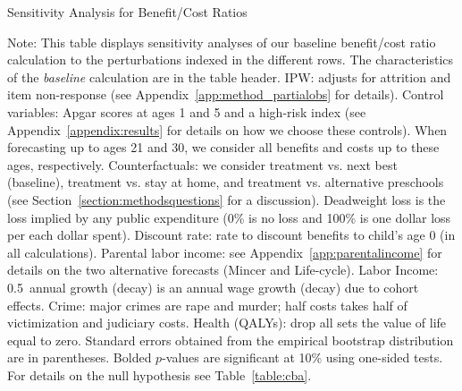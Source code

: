\begin{table}
\begin{threeparttable}
\caption{Sensitivity Analysis for Benefit/Cost Ratios}
\label{table:bcsens}
\centering
\scriptsize

\begin{tablenotes}
\scriptsize
\item Note: This table displays sensitivity analyses of our baseline benefit/cost ratio calculation to the perturbations indexed in the different rows. The characteristics of the \textit{baseline} calculation are in the table header. IPW: adjusts for attrition and item non-response (see  Appendix~\ref{app:method_partialobs} for details). Control variables: Apgar scores at ages 1 and 5 and a high-risk index (see  Appendix~\ref{appendix:results} for details on how we choose these controls). When forecasting up to ages 21 and 30, we consider all benefits and costs up to these ages, respectively. Counterfactuals: we consider treatment vs. next best (baseline), treatment vs. stay at home, and treatment vs. alternative preschools (see Section~\ref{section:methodsquestions} for a discussion). Deadweight loss is the loss implied by any public expenditure (0\% is no loss and 100\% is one dollar loss per each dollar spent). Discount rate: rate to discount benefits to child's age 0 (in all calculations). Parental labor income: see  Appendix~\ref{app:parentalincome} for details on the two alternative forecasts (Mincer and Life-cycle). Labor Income: 0.5\ annual growth (decay) is an annual wage growth (decay) due to cohort effects. Crime: major crimes are rape and murder; half costs takes half of victimization and judiciary costs. Health (QALYs): drop all sets the value of life equal to zero. Standard errors obtained from the empirical bootstrap distribution are in parentheses. Bolded $p$-values are significant at 10\% using one-sided tests. For details on the null hypothesis see Table~\ref{table:cba}.
\end{tablenotes}
\end{threeparttable}
\end{table}

